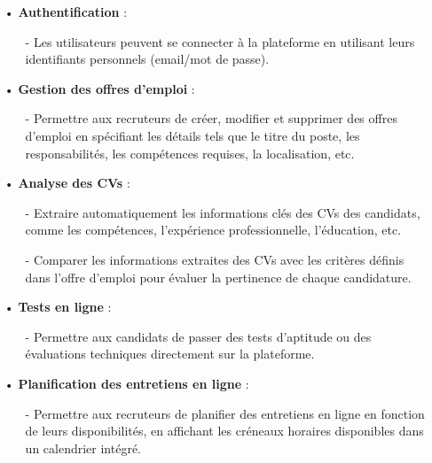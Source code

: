 \begin{itemize}
    \setlength{\itemsep}{0.3cm}
   \item[•] \textbf{Authentification} :
   \begin{itemize}
    \setlength{\itemsep}{0.2cm}
       \item[-] Les utilisateurs peuvent se connecter à la plateforme en utilisant leurs identifiants personnels (email/mot de passe).
   \end{itemize}
   \item[•] \textbf{Gestion des offres d'emploi} :
   \begin{itemize}
    \setlength{\itemsep}{0.2cm}
       \item[-] Permettre aux recruteurs de créer, modifier et supprimer des offres d'emploi en spécifiant les détails tels que le titre du poste, les responsabilités, les compétences requises, la localisation, etc.
   \end{itemize}
   
   \item[•] \textbf{Analyse des CVs} :
   \begin{itemize}
    \setlength{\itemsep}{0.2cm}
       \item[-] Extraire automatiquement les informations clés des CVs des candidats, comme les compétences, l'expérience professionnelle, l'éducation, etc.
       \item[-] Comparer les informations extraites des CVs avec les critères définis dans l'offre d'emploi pour évaluer la pertinence de chaque candidature.
   \end{itemize}
   
   \item[•] \textbf{Tests en ligne} :
   \begin{itemize}
    \setlength{\itemsep}{0.2cm}
       \item[-] Permettre aux candidats de passer des tests d'aptitude ou des évaluations techniques directement sur la plateforme.
   \end{itemize}
   
   \item[•] \textbf{Planification des entretiens en ligne} :
   \begin{itemize}
    \setlength{\itemsep}{0.2cm}
       \item[-] Permettre aux recruteurs de planifier des entretiens en ligne 
       en fonction de leurs disponibilités, 
       en affichant les créneaux horaires disponibles dans un 
       calendrier intégré.
   \end{itemize}
   

\end{itemize}
